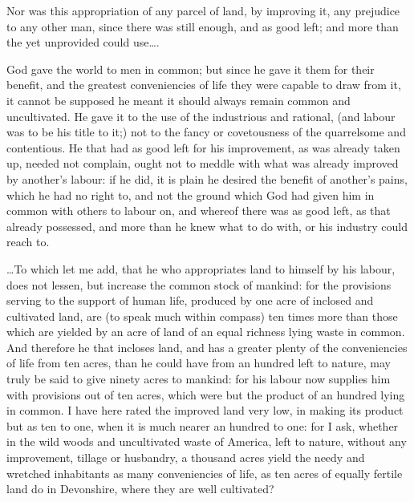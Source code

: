 Nor was this appropriation of any parcel of land, by improving it, any prejudice
to any other man, since there was still enough, and as good left; and more than
the yet unprovided could use\ldots .

God gave the world to men in common; but since he gave it them for their
benefit, and the greatest conveniencies of life they were capable to draw from
it, it cannot be supposed he meant it should always remain common and
uncultivated. He gave it to the use of the industrious and rational, (and labour
was to be his title to it;) not to the fancy or covetousness of the quarrelsome
and contentious. He that had as good left for his improvement, as was already
taken up, needed not complain, ought not to meddle with what was already
improved by another's labour: if he did, it is plain he desired the benefit of
another's pains, which he had no right to, and not the ground which God had
given him in common with others to labour on, and whereof there was as good
left, as that already possessed, and more than he knew what to do with, or his
industry could reach to.

\ldots To which let me add, that he who appropriates land to himself by his
labour, does not lessen, but increase the common stock of mankind: for the
provisions serving to the support of human life, produced by one acre of
inclosed and cultivated land, are (to speak much within compass) ten times more
than those which are yielded by an acre of land of an equal richness lying waste
in common. And therefore he that incloses land, and has a greater plenty of the
conveniencies of life from ten acres, than he could have from an hundred left to
nature, may truly be said to give ninety acres to mankind: for his labour now
supplies him with provisions out of ten acres, which were but the product of an
hundred lying in common. I have here rated the improved land very low, in making
its product but as ten to one, when it is much nearer an hundred to one: for I
ask, whether in the wild woods and uncultivated waste of America, left to
nature, without any improvement, tillage or husbandry, a thousand acres yield
the needy and wretched inhabitants as many conveniencies of life, as ten acres
of equally fertile land do in Devonshire, where they are well cultivated?

